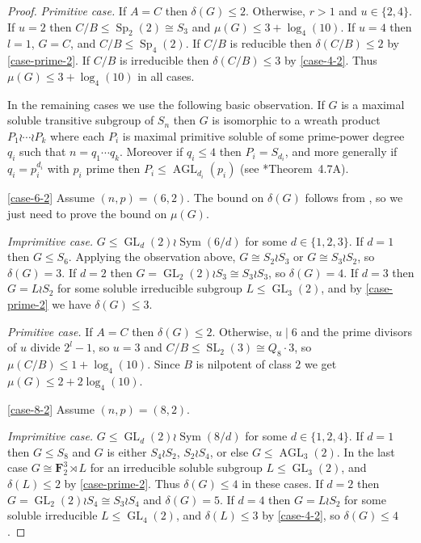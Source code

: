 \documentclass[11pt,reqno]{amsart}
\numberwithin{equation}{section}
\theoremstyle{definition}
\theoremstyle{remark}
\def\F{\mathbf{F}}
\newcommand\opr[1]{\operatorname{#1}}
\def\Sym{\opr{Sym}}
\def\GL{\opr{GL}}
\def\SL{\opr{SL}}
\def\Sp{\opr{Sp}}
\def\AGL{\opr{AGL}}
\numberwithin{equation}{section}
\begin{document}
\begin{proof}
    \emph{Primitive case.}
    If $A = C$ then $\delta(G) \le 2$.
    Otherwise, $r > 1$ and $u \in \{2, 4\}$.
    If $u = 2$ then $C / B \le \Sp_2(2) \cong S_3$
    and $\mu(G) \le 3 + \log_4(10)$.
    If $u = 4$ then $l = 1$, $G = C$, and $C / B \le \Sp_4(2)$.
    If $C / B$ is reducible then $\delta(C/B)\le 2$ by \ref{case-prime-2}.
    If $C / B$ is irreducible then $\delta(C / B) \le 3$ by \ref{case-4-2}.
    Thus $\mu(G) \le 3 + \log_4(10)$ in all cases.

    In the remaining cases we use the following basic observation. If $G$ is a maximal soluble transitive subgroup of $S_n$ then $G$ is isomorphic to a wreath product $P_1 \wr \cdots \wr P_k$ where each $P_i$ is maximal primitive soluble of some prime-power degree $q_i$ such that $n = q_1\cdots q_k$. Moreover if $q_i \le 4$ then $P_i = S_{d_i}$, and more generally if $q_i = p_i^{d_i}$ with $p_i$ prime then $P_i \le \AGL_{d_i}(p_i)$ (see \cite{DM}*{Theorem~4.7A}).

    \ref{case-6-2}
    Assume $(n, p) = (6, 2)$. The bound on $\delta(G)$ follows from , so we just need to prove the bound on $\mu(G)$.

    \emph{Imprimitive case.} $G \le \GL_d(2) \wr \Sym(6/d)$ for some $d \in \{1, 2, 3\}$.
    If $d = 1$ then $G \le S_6$. Applying the observation above, $G \cong S_2 \wr S_3$ or $G \cong S_3 \wr S_2$, so $\delta(G) = 3$.
    If $d = 2$ then $G = \GL_2(2) \wr S_3 \cong S_3 \wr S_3$, so $\delta(G) = 4$.
    If $d = 3$ then $G = L \wr S_2$ for some soluble irreducible subgroup $L \le \GL_3(2)$, and by \ref{case-prime-2} we have $\delta(G) \le 3$.

    \emph{Primitive case.}
    If $A = C$ then $\delta(G) \le 2$.
    Otherwise, $u \mid 6$ and the prime divisors of $u$ divide $2^l-1$, so $u=3$ and $C/B\le \SL_2(3) \cong Q_8 \cdot 3$, so $\mu(C / B) \le 1 + \log_4(10)$.
    Since $B$ is nilpotent of class $2$ we get $\mu(G) \le 2 + 2 \log_4(10)$.

    \ref{case-8-2}
    Assume $(n, p) = (8, 2)$.

    \emph{Imprimitive case.} $G \le \GL_d(2) \wr \Sym(8/d)$ for some $d \in \{1, 2, 4\}$.
    If $d = 1$ then $G \le S_8$ and $G$ is either $S_4 \wr S_2$, $S_2 \wr S_4$, or else $G \le \AGL_3(2)$.
    In the last case $G \cong \F_2^3 \rtimes L$ for an irreducible soluble subgroup $L \le \GL_3(2)$, and $\delta(L) \le 2$ by \ref{case-prime-2}.
    Thus $\delta(G) \le 4$ in these cases.
    If $d = 2$ then $G = \GL_2(2) \wr S_4 \cong S_3 \wr S_4$ and $\delta(G) = 5$.
    If $d = 4$ then $G = L \wr S_2$ for some soluble irreducible $L \le \GL_4(2)$, and $\delta(L) \le 3$ by \ref{case-4-2}, so $\delta(G) \le 4$.


\end{proof}
\end{document}
